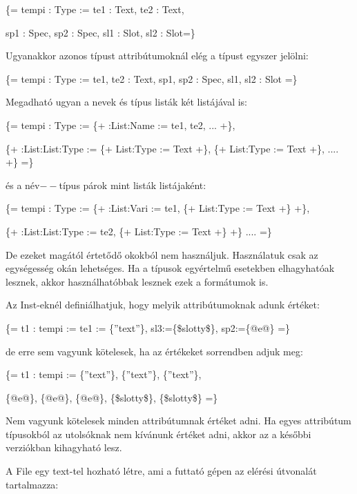 \{= tempi : Type := te1 : Text, te2 : Text, 

sp1 : Spec, sp2 : Spec, sl1 : Slot, sl2 : Slot=\}

Ugyanakkor azonos típust attribútumoknál elég a típust egyszer jelölni:

\{= tempi : Type := te1, te2 : Text, sp1, sp2 : Spec, sl1, sl2 : Slot =\}

Megadható ugyan a nevek és típus listák két listájával is:

\{= tempi : Type := \{+ :List:Name := te1, te2, ... +\}, 

\{+ :List:List:Type := \{+ List:Type := Text +\}, \{+ List:Type := Text +\}, .... +\} =\}

és a név$--$típus párok mint listák listájaként:

\{= tempi : Type := \{+ :List:Vari := te1, \{+ List:Type := Text +\} +\}, 

\{+ :List:List:Type := te2, \{+ List:Type := Text +\} +\} .... =\}

De ezeket magától értetődő okokból nem használjuk.
Használatuk csak az egységesség okán lehetséges.
Ha a típusok egyértelmű esetekben elhagyhatóak lesznek, akkor használhatóbbak lesznek ezek a formátumok is.

Az Inst-eknél definiálhatjuk, hogy melyik attribútumoknak adunk értéket:

\{= t1 : tempi := te1 := \{”text”\}, sl3:=\{\$slotty\$\}, sp2:=\{@e@\} =\}

de erre sem vagyunk kötelesek, ha az értékeket sorrendben adjuk meg:

\{= t1 : tempi := \{”text”\}, \{”text”\}, \{”text”\}, 

\{@e@\}, \{@e@\}, \{@e@\}, \{\$slotty\$\}, \{\$slotty\$\} =\}

Nem vagyunk kötelesek minden attribútumnak értéket adni.
Ha egyes attribútum típusokból az utolsóknak nem kívánunk értéket adni, akkor az a későbbi verziókban kihagyható lesz.

A File egy text-tel hozható létre, ami a futtató gépen az elérési útvonalát tartalmazza:

